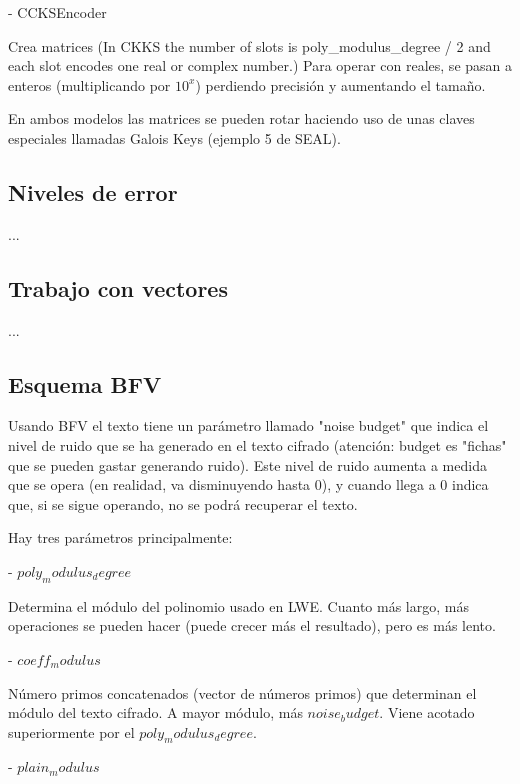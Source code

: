     - CCKSEncoder

    Crea matrices (In CKKS the number of slots is poly\_modulus\_degree / 2 and each slot encodes one real or complex number.) Para operar con reales, se pasan a enteros (multiplicando por $10^x$) perdiendo precisión y aumentando el tamaño.


    En ambos modelos las matrices se pueden rotar haciendo uso de unas claves especiales llamadas Galois Keys (ejemplo 5 de SEAL).

\subsection{Niveles de error}

...

\subsection{Trabajo con vectores}

...

\subsection{Esquema BFV}

Usando BFV el texto tiene un parámetro llamado "noise budget" que indica el nivel de ruido que se ha generado en el texto cifrado (atención: budget es "fichas" que se pueden gastar generando ruido). Este nivel de ruido aumenta a medida que se opera (en realidad, va disminuyendo hasta 0), y cuando llega a 0 indica que, si se sigue operando, no se podrá recuperar el texto.


Hay tres parámetros principalmente:

- $poly_modulus_degree$

Determina el módulo del polinomio usado en LWE. Cuanto más largo, más operaciones se pueden hacer (puede crecer más el resultado), pero es más lento.

- $coeff_modulus$

Número primos concatenados (vector de números primos) que determinan el módulo del texto cifrado. A mayor módulo, más $noise_budget$. Viene acotado superiormente por el $poly_modulus_degree$.

- $plain_modulus$

